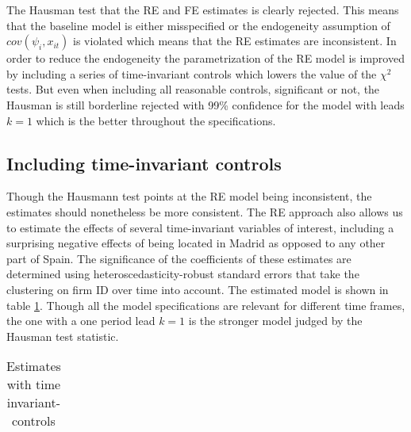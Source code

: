 The Hausman test that the RE and FE estimates is clearly rejected. This means that the baseline model is either misspecified or the endogeneity assumption of $cov(\psi_i,x_{it})$ is violated which means that the RE estimates are inconsistent. In order to reduce the endogeneity the parametrization of the RE model is improved by including a series of time-invariant controls which lowers the value of the $\chi^2$ tests. But even when including all reasonable controls, significant or not, the Hausman is still borderline rejected with 99\% confidence for the model with leads $k=1$ which is the better throughout the specifications.

\subsection{Including time-invariant controls}
\label{controls}
Though the Hausmann test points at the RE model being inconsistent, the estimates should nonetheless be more consistent. The RE approach also allows us to estimate the effects of several time-invariant variables of interest, including a surprising negative effects of being located in Madrid as opposed to any other part of Spain. The significance of the coefficients of these estimates are determined using heteroscedasticity-robust standard errors that take the clustering on firm ID over time into account. The estimated model is shown in table \ref{tab:controls}. Though all the model specifications are relevant for different time frames, the one with a one period lead $k=1$ is the stronger model judged by the Hausman test statistic.
\begin{table}[H]
  \centering
  \caption{Estimates with time invariant-controls}
  \footnotesize
    \begin{tabular}{lcccc}
    \toprule
        
    \end{tabular}
    \\ 
  \label{tab:controls}
\end{table}
